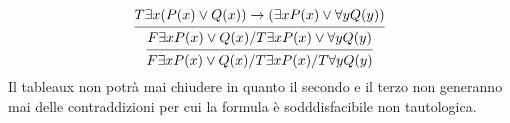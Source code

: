 \begin{equation*}
\begin{prooftree}
\hypo{T \exists x (P(x) \lor Q(x)) \rightarrow (\exists x P(x) \lor \forall y Q(y))}
\infer1 {F \exists x P(x) \lor Q(x)/T \exists x P(x) \lor \forall y Q(y)}
\infer1 {F \exists x P(x) \lor Q(x)/T \exists x P(x)/T \forall y Q(y)}
\end{prooftree}
\end{equation*}
Il tableaux non potrà mai chiudere in quanto il secondo e il terzo non generanno mai delle contraddizioni
per cui la formula è sodddisfacibile non tautologica.
